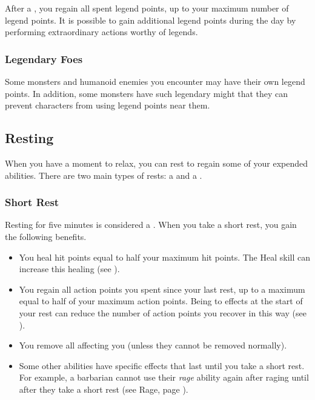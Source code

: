             After a , you regain all spent legend points, up to your maximum number of legend points.
            It is possible to gain additional legend points during the day by performing extraordinary actions worthy of legends.

        \subsubsection{Legendary Foes}
            Some monsters and humanoid enemies you encounter may have their own legend points.
            In addition, some monsters have such legendary might that they can prevent characters from using legend points near them.

    \subsection{Resting}
        When you have a moment to relax, you can rest to regain some of your expended abilities.
        There are two main types of rests: a  and a .

        \subsubsection{Short Rest}\label{Short Rest}
            Resting for five minutes is considered a .
            When you take a short rest, you gain the following benefits.
            \begin{itemize}
                \item You heal hit points equal to half your maximum hit points.
                    The Heal skill can increase this healing (see ).
                \item You regain all action points you spent since your last rest, up to a maximum equal to half of your maximum action points.
                    Being  to effects at the start of your rest can reduce the number of action points you recover in this way (see ).
                \item You remove all  affecting you (unless they cannot be removed normally).
                \item Some other abilities have specific effects that last until you take a short rest.
                    For example, a barbarian cannot use their \textit{rage} ability again after raging until after they take a short rest (see Rage, page ).
            \end{itemize}

